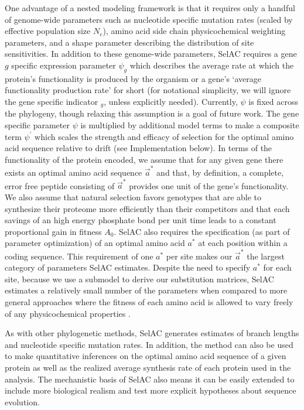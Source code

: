 \documentclass[12pt,letterpaper,fleqn]{article}
\newcommand{\PC}{physicochemical\xspace}
\newcommand{\Ne}{\ensuremath{{N_e}}\xspace} %
\newcommand{\selac}{SelAC\xspace}
\newcommand{\aopt}{\ensuremath{a^*}\xspace}
\newcommand{\aoptvec}{\ensuremath{\Vec{a}^*}\xspace}
\newcommand{\psig}{\ensuremath{\psi_{g}}\xspace}
\newcommand{\psiprime}{\ensuremath{\psi^\prime}\xspace}
\begin{document}
One advantage of a nested modeling framework is that it requires only a handful of genome-wide parameters such as nucleotide specific mutation rates (scaled by effective population size \Ne), amino acid side chain physicochemical weighting parameters, and a shape parameter describing the distribution of site sensitivities.
In addition to these genome-wide parameters, \selac requires a gene $g$ specific expression parameter $\psig$ which describes the average rate at which the protein's functionality is produced by the organism or a gene's `average functionality production rate' for short (for notational simplicity, we will ignore the gene specific indicator $_g$, unless explicitly needed).
Currently, $\psi$ is fixed across the phylogeny, though relaxing this assumption is a goal of future work.
The gene specific parameter $\psi$ is multiplied by additional model terms to make a composite term $\psiprime$ which scales the strength and efficacy of selection for the optimal amino acid sequence relative to drift (see Implementation below).
In terms of the functionality of the protein encoded, we assume that for any given gene there exists an optimal amino acid sequence \aoptvec and that, by definition, a complete, error free peptide consisting of \aoptvec provides one unit of the gene's functionality.
We also assume that natural selection favors genotypes that are able to synthesize their proteome more efficiently than their competitors and that each savings of an high energy phosphate bond per unit time leads to a constant proportional gain in fitness $A_0$.
\selac also requires the specification (as part of parameter optimization) of an optimal amino acid \aopt at each position within a coding sequence.
This requirement of one \aopt per site makes our \aoptvec the largest category of parameters \selac estimates.
Despite the need to specify \aopt for each site, because we use a submodel to derive our substitution matrices, \selac estimates a relatively small number of the parameters when compared to more general approaches where the fitness of each amino acid is allowed to vary freely of any \PC properties \citep{HalpernAndBruno1998,LartillotAndPhilippe2004,RodrigueAndLartillot2014}.

As with other phylogenetic methods, \selac generates estimates of branch lengths and nucleotide specific mutation rates.
In addition, the method can also be used to make quantitative inferences on the optimal amino acid sequence of a given protein as well as the realized average synthesis rate of each protein used in the analysis.
The mechanistic basis of \selac also means it can be easily extended to include more biological realism and test more explicit hypotheses about sequence evolution.
\end{document}
